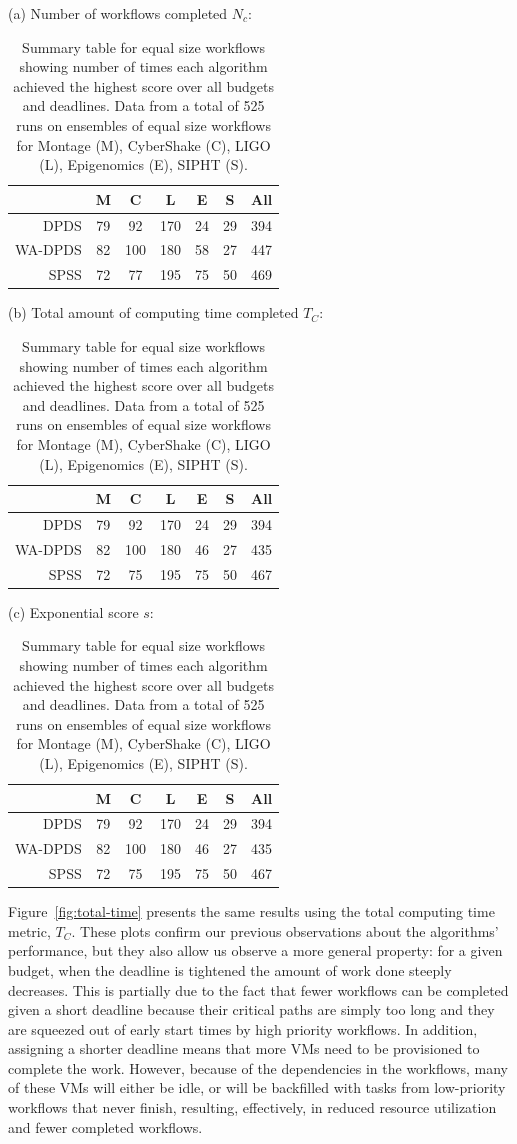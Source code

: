 \documentclass{sig-alternate}
\begin{document}
\begin{table}[tb]
\centering

(a) Number of workflows completed $N_c$:
\medskip
\begin{tabular}{r|cccccc}
 & M & C & L & E & S & All\tabularnewline
\hline
DPDS      &   79  & 92  & 170 &  24 &  29 & 394\tabularnewline
WA-DPDS   &   82  & 100 & 180 &  58 &  27 & 447\tabularnewline
SPSS      &   72  & 77  & 195 &  75 &  50 & 469 \tabularnewline
\end{tabular}
\medskip

(b) Total amount of computing time completed $T_C$:
\medskip
\begin{tabular}{r|cccccc}
 & M & C & L & E & S & All\tabularnewline
\hline
DPDS      &   79  & 92  & 170 &  24 &  29 & 394\tabularnewline
WA-DPDS   &   82  & 100 & 180 &  46 &  27 & 435\tabularnewline
SPSS      &   72  & 75  & 195 &  75 &  50 & 467 \tabularnewline
\end{tabular}
\medskip

(c) Exponential score $s$:
\medskip
\begin{tabular}{r|cccccc}
 & M & C & L & E & S & All\tabularnewline
\hline
DPDS      &   79  & 92  & 170 &  24 &  29 & 394\tabularnewline
WA-DPDS   &   82  & 100 & 180 &  46 &  27 & 435\tabularnewline
SPSS      &   72  & 75  & 195 &  75 &  50 & 467 \tabularnewline
\end{tabular}
\medskip

\caption{Summary table for equal size workflows showing number of times each
algorithm achieved the highest score over all budgets and deadlines. Data from a total of 525 runs on 
ensembles of equal size workflows for Montage (M), CyberShake (C), LIGO (L), 
Epigenomics (E), SIPHT (S).
\label{tab:num-dags-equal}}
\end{table}

Figure~\ref{fig:total-time} presents the same results using the total computing
time metric, $T_C$. These plots confirm our previous observations about the
algorithms' performance, but they also allow us observe a more general property:
for a given budget, when the deadline is tightened the amount of work done
steeply decreases. This is partially due to the fact that fewer workflows can be
completed given a short deadline because their critical paths are simply too long
and they are squeezed out of early start times by high priority workflows.
In addition, assigning a shorter deadline means that more VMs need to be
provisioned to complete the work. However, because of the dependencies in the 
workflows, many of these VMs will either be idle, or will be backfilled with 
tasks from low-priority workflows that never finish, resulting, effectively, 
in reduced resource utilization and fewer completed workflows.
\end{document}
